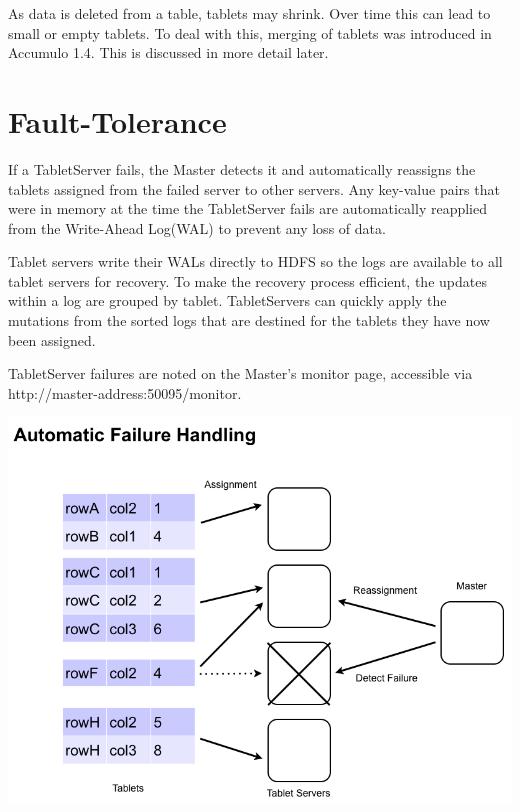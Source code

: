 As data is deleted from a table, tablets may shrink. Over time this can lead
to small or empty tablets. To deal with this, merging of tablets was
introduced in Accumulo 1.4. This is discussed in more detail later.

\section{Fault-Tolerance}

If a TabletServer fails, the Master detects it and automatically reassigns the tablets
assigned from the failed server to other servers. Any key-value pairs that were in
memory at the time the TabletServer fails are automatically reapplied from the Write-Ahead
Log(WAL) to prevent any loss of data.

Tablet servers write their WALs directly to HDFS so the logs are available to all tablet
servers for recovery. To make the recovery process efficient, the updates within a log are
grouped by tablet.  TabletServers can quickly apply the mutations from the sorted logs
that are destined for the tablets they have now been assigned.

TabletServer failures are noted on the Master's monitor page, accessible via\\
\mbox{http://master-address:50095/monitor}.

\begin{center}
\includegraphics[scale=0.4]{images/failure_handling.png}
\end{center}

